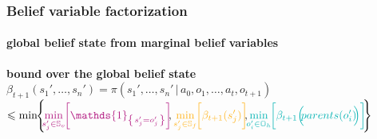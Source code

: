 \documentclass[12pt,svgnames,table]{beamer}
\newcommand{\paren}[1]{\left( \left. #1 \right. \right)}
\newcommand{\set}[1]{\left\{ \left. #1 \right. \right\}}
\newcommand{\sachant}{\, \right| \left. \,}
\begin{document}
\begin{frame}
\frametitle{Belief variable factorization}
\framesubtitle{\footnotesize global belief state from marginal belief variables}
\textbf{bound over the global belief state}
$\beta_{t+1}(s_1',\ldots,s_n') = \pi \paren{ s_1',\ldots,s_n' \sachant a_0,o_1, \ldots, a_{t},o_{t+1} } $\\
\hspace{0.5cm} $ \leqslant \displaystyle \min \hspace{-0.1cm} \Bigg\{ \hspace{-0.1cm} 
{\color{violet} \min_{s_j' \in \mathbb{S}_v} \hspace{-0.1cm} \bigg[ \mathds{1}_{ \set{s_j'=o_j'}} \bigg]} \hspace{-0.1cm}, 
{\color{orangee} \min_{s_j' \in \mathbb{S}_f} \hspace{-0.1cm} \bigg[ \beta_{t+1}(s_j') \bigg]} \hspace{-0.1cm} , \hspace{-0.1cm} 
{\color{gggreen} \min_{o_i' \in \mathbb{O}_h} \hspace{-0.1cm} \bigg[ \beta_{t+1} \Big( \hspace{-0.1cm} parents(o_i') 
\hspace{-0.1cm} \Big) \bigg]} \hspace{-0.1cm}  \Bigg\} \hspace{-0.3cm}$\\
\end{frame}
\end{document}
